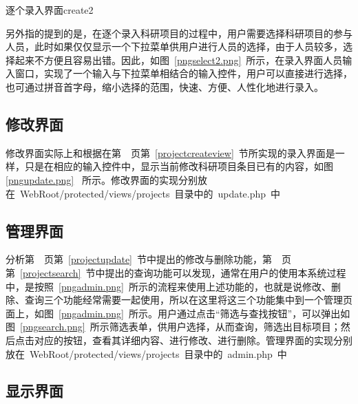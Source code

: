 \begin{pics}[htbp]{逐个录入界面}{create2}
\end{pics}

另外指的提到的是，在逐个录入科研项目的过程中，用户需要选择科研项目的参与人员，此时如果仅仅显示一个下拉菜单供用户进行人员的选择，由于人员较多，选择起来不方便且容易出错。因此，如图~\ref{pngselect2.png}~所示，在录入界面人员输入窗口，实现了一个输入与下拉菜单相结合的输入控件，用户可以直接进行选择，也可通过拼音首字母，缩小选择的范围，快速、方便、人性化地进行录入。



\subsection{修改界面}

修改界面实际上和根据在第~\pageref{projectcreateview}~页第~\ref{projectcreateview}~节所实现的录入界面是一样，只是在相应的输入控件中，显示当前修改科研项目条目已有的内容，如图\ref{pngupdate.png}~
所示。修改界面的实现分别放在~WebRoot/protected/views/projects~目录中的~update.php~中


\subsection{管理界面}
分析第~\pageref{projectupdate}~页第~\ref{projectupdate}~节中提出的修改与删除功能，第~\pageref{projectsearch}~页第~\ref{projectsearch}~节中提出的查询功能可以发现，通常在用户的使用本系统过程中，是按照~\ref{pngadmin.png}~所示的流程来使用上述功能的，也就是说修改、删除、查询三个功能经常需要一起使用，所以在这里将这三个功能集中到一个管理页面上，如图~\ref{pngadmin.png}~所示。用户通过点击“筛选与查找按钮”，可以弹出如图~\ref{pngsearch.png}~所示筛选表单，供用户选择，从而查询，筛选出目标项目；然后点击对应的按钮，查看其详细内容、进行修改、进行删除。管理界面的实现分别放在~WebRoot/protected/views/projects~目录中的~admin.php~中



\subsection{显示界面}

